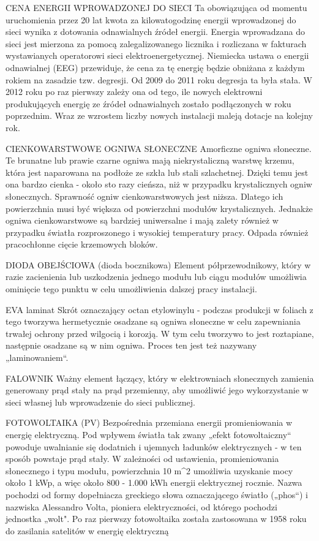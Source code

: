 \documentclass[12pt,a4paper]{article}
\begin{document}
CENA ENERGII WPROWADZONEJ DO SIECI
Ta obowiązująca od momentu uruchomienia przez 20 lat kwota za kilowatogodzinę energii wprowadzonej do sieci wynika z dotowania odnawialnych źródeł energii. Energia wprowadzana do sieci jest mierzona za pomocą zalegalizowanego licznika i rozliczana w fakturach wystawianych operatorowi sieci elektroenergetycznej. Niemiecka ustawa o energii odnawialnej (EEG) przewiduje, że cena za tę energię będzie obniżana z każdym rokiem na zasadzie tzw. degresji. Od 2009 do 2011 roku degresja ta była stała. W 2012 roku po raz pierwszy zależy ona od tego, ile nowych elektrowni produkujących energię ze źródeł odnawialnych zostało podłączonych w roku poprzednim. Wraz ze wzrostem liczby nowych instalacji maleją dotacje na kolejny rok.


CIENKOWARSTWOWE OGNIWA SŁONECZNE
Amorficzne ogniwa słoneczne. Te brunatne lub prawie czarne ogniwa mają niekrystaliczną warstwę krzemu, która jest naparowana na podłoże ze szkła lub stali szlachetnej. Dzięki temu jest ona bardzo cienka - około sto razy cieńsza, niż w przypadku krystalicznych ogniw słonecznych. Sprawność ogniw cienkowarstwowych jest niższa. Dlatego ich powierzchnia musi być większa od powierzchni modułów krystalicznych. Jednakże ogniwa cienkowarstwowe są bardziej uniwersalne i mają zalety również w przypadku światła rozproszonego i wysokiej temperatury pracy. Odpada również pracochłonne cięcie krzemowych bloków.


DIODA OBEJŚCIOWA (dioda bocznikowa)
Element półprzewodnikowy, który w razie zacienienia lub uszkodzenia jednego modułu lub ciągu modułów umożliwia ominięcie tego punktu w celu umożliwienia dalszej pracy instalacji.

EVA laminat
Skrót oznaczający octan etylowinylu - podczas produkcji w foliach z tego tworzywa hermetycznie osadzane są ogniwa słoneczne w celu zapewniania trwałej ochrony przed wilgocią i korozją. W tym celu tworzywo to jest roztapiane, następnie osadzane są w nim ogniwa. Proces ten jest też nazywany „laminowaniem“.


FALOWNIK
Ważny element łączący, który w elektrowniach słonecznych zamienia generowany prąd stały na prąd przemienny, aby umożliwić jego wykorzystanie w sieci własnej lub wprowadzenie do sieci publicznej.


FOTOWOLTAIKA (PV)
Bezpośrednia przemiana energii promieniowania w energię elektryczną. Pod wpływem światła tak zwany „efekt fotowoltaiczny“ powoduje uwalnianie się dodatnich i ujemnych ładunków elektrycznych - w ten sposób powstaje prąd stały. W zależności od ustawienia, promieniowania słonecznego i typu modułu, powierzchnia 10 m^{2} umożliwia uzyskanie mocy około 1 kWp, a więc około 800 - 1.000 kWh energii elektrycznej rocznie. Nazwa pochodzi od formy dopełniacza greckiego słowa oznaczającego światło („phos“) i nazwiska Alessandro Volta, pioniera elektryczności, od którego pochodzi jednostka „wolt". Po raz pierwszy fotowoltaika została zastosowana w 1958 roku do zasilania satelitów w energię elektryczną
\end{document}
